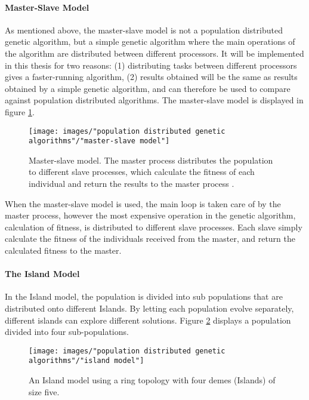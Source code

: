 \paragraph*{Master-Slave Model}
As mentioned above, the master-slave model is not a population distributed genetic algorithm, but a simple genetic algorithm where the main operations of the algorithm are distributed between different processors. It will be implemented in this thesis for two reasons: (1) distributing tasks between different processors gives a faster-running algorithm, (2) results obtained will be the same as results obtained by a simple genetic algorithm, and can therefore be used to compare against population distributed algorithms. The master-slave model is displayed in figure \ref{Master-Slave Model}.\\


\begin{figure}[h!]
\begin{center}
\texttt{[image: images/"population distributed genetic algorithms"/"master-slave model"]}
\caption{Master-slave model. The master process distributes the population to different slave processes, which calculate the fitness of each individual and return the results to the master process \citep{Gong}.}
\label{Master-Slave Model}
\end{center}
\end{figure}


\noindent When the master-slave model is used, the main loop is taken care of by the master process, however the most expensive operation in the genetic algorithm, calculation of fitness, is distributed to different slave processes. Each slave simply calculate the fitness of the individuals received from the master, and return the calculated fitness to the master. 


\paragraph*{The Island Model}
In the Island model, the population is divided into sub populations that are distributed onto different Islands. By letting each population evolve separately, different islands can explore different solutions. Figure \ref{Island model} displays a population divided into four sub-populations. \\ 


\begin{figure}[h!]
\begin{center}
\texttt{[image: images/"population distributed genetic algorithms"/"island model"]}
\caption{An Island model using a ring topology with four demes (Islands) of size five. \citep{Gong}}
\label{Island model}
\end{center}
\end{figure}


